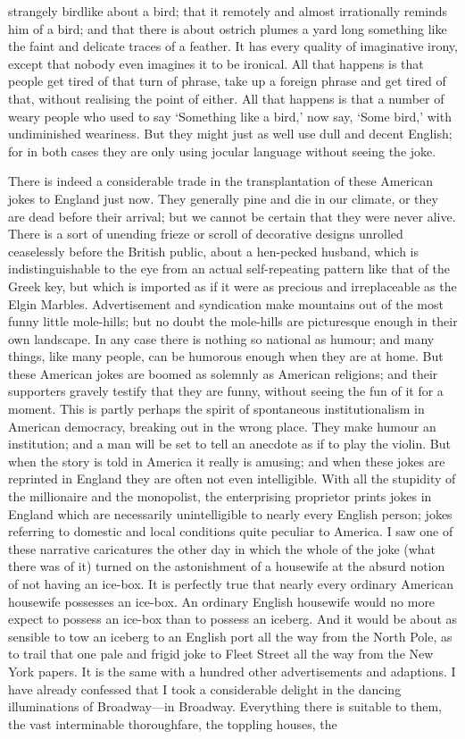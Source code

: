 \documentclass{book}
\begin{document}
strangely birdlike about a bird; that it remotely and almost irrationally reminds him of a bird; and that there is about ostrich plumes a yard long something like the faint and delicate traces of a feather. It has every quality of imaginative irony, except that nobody even imagines it to be ironical. All that happens is that people get tired of that turn of phrase, take up a foreign phrase and get tired of that, without realising the point of either. All that happens is that a number of weary people who used to say ‘Something like a bird,’ now say, ‘Some bird,’ with undiminished weariness. But they might just as well use dull and decent English; for in both cases they are only using jocular language without seeing the joke.

There is indeed a considerable trade in the transplantation of these American jokes to England just now. They generally pine and die in our climate, or they are dead before their arrival; but we cannot be certain that they were never alive. There is a sort of unending frieze or scroll of decorative designs unrolled ceaselessly before the British public, about a hen-pecked husband, which is indistinguishable to the eye from an actual self-repeating pattern like that of the Greek key, but which is imported as if it were as precious and irreplaceable as the Elgin Marbles. Advertisement and syndication make mountains out of the most funny little mole-hills; but no doubt the mole-hills are picturesque enough in their own landscape. In any case there is nothing so national as humour; and many things, like many people, can be humorous enough when they are at home. But these American jokes are boomed as solemnly as American religions; and their supporters gravely testify that they are funny, without seeing the fun of it for a moment. This is partly perhaps the spirit of spontaneous institutionalism in American democracy, breaking out in the wrong place. They make humour an institution; and a man will be set to tell an anecdote as if to play the violin. But when the story is told in America it really is amusing; and when these jokes are reprinted in England they are often not even intelligible. With all the stupidity of the millionaire and the monopolist, the enterprising proprietor prints jokes in England which are necessarily unintelligible to nearly every English person; jokes referring to domestic and local conditions quite peculiar to America. I saw one of these narrative caricatures the other day in which the whole of the joke (what there was of it) turned on the astonishment of a housewife at the absurd notion of not having an ice-box. It is perfectly true that nearly every ordinary American housewife possesses an ice-box. An ordinary English housewife would no more expect to possess an ice-box than to possess an iceberg. And it would be about as sensible to tow an iceberg to an English port all the way from the North Pole, as to trail that one pale and frigid joke to Fleet Street all the way from the New York papers. It is the same with a hundred other advertisements and adaptions. I have already confessed that I took a considerable delight in the dancing illuminations of Broadway—in Broadway. Everything there is suitable to them, the vast interminable thoroughfare, the toppling houses, the 
\end{document}
